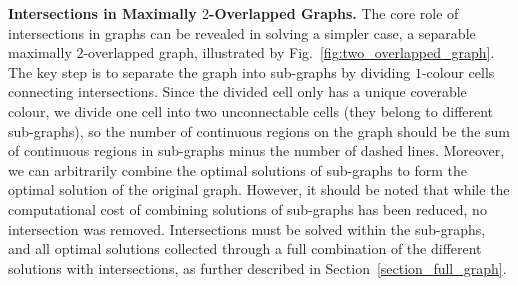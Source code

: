 \documentclass[journal]{IEEEtran}
\begin{document}
\textbf{Intersections in Maximally $2$-Overlapped Graphs.}
The core role of intersections in graphs can be revealed in solving a simpler case, a separable maximally $2$-overlapped graph, 
illustrated by Fig.~\ref{fig:two_overlapped_graph}.  
The key step is to separate the graph into sub-graphs by dividing $1$-colour cells connecting intersections. 
Since the divided cell only has a unique coverable colour, we divide one cell into two unconnectable cells (they belong to different sub-graphs), so the number of continuous regions on the graph should be the sum of continuous regions in sub-graphs minus the number of dashed lines. 
Moreover, we can arbitrarily combine the optimal solutions of sub-graphs to form the optimal solution of the original graph. 
However, it should be noted that while the computational cost of combining solutions of sub-graphs has been reduced, no intersection was removed. 
Intersections must be solved within the sub-graphs, and all optimal solutions collected through a full combination of the different solutions with 
intersections, as further described in Section~\ref{section_full_graph}.
\end{document}
